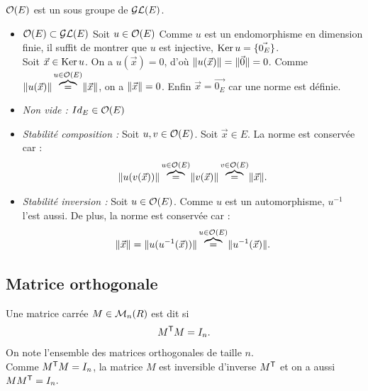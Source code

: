 \documentclass{book}
\begin{document}
\begin{Demonstration}
$\mathcal{O}(E)$ est un sous groupe de $\mathcal{GL}(E)$.
\begin{itemize}
\item \textit{$\mathcal{O}(E)\subset \mathcal{GL}(E)$} Soit $u\in \mathcal{O}(E)$ Comme $u$ est un endomorphisme en dimension finie, il suffit de montrer que $u$ est injective, $\operatorname{Ker} u=\{\vec{0_E}\}$.\\
Soit $\vec{x}\in  \operatorname{Ker} u$. On a $u( \vec{x})=0$, d'où $\mathopen\lVert u(\vec{x}) \mathclose\rVert=\mathopen\lVert \vec{0} \mathclose\rVert=0$.   Comme $\mathopen\lVert u( \vec{x}) \mathclose\rVert\overbrace{=}^{u\in\mathcal{O}(E) }\mathopen\lVert \vec{x} \mathclose\rVert$, on a $\mathopen\lVert \vec{x} \mathclose\rVert=0$. Enfin $\vec{x}=\vec{0_E}$ car une norme est définie.
\item \textit{Non vide :} $Id_E\in \mathcal{O}(E)$
\item \textit{Stabilité composition :} Soit $u,v \in \mathcal{O}(E)$. Soit $\vec{x}\in  E$. La norme est conservée car :
$$ \mathopen\lVert u(v(\vec{x})) \mathclose\rVert\overbrace{=}^{u\in \mathcal{O}(E)}\mathopen\lVert v(\vec{x}) \mathclose\rVert\overbrace{=}^{v\in \mathcal{O}(E)}\mathopen\lVert \vec{x} \mathclose\rVert.$$
\item \textit{Stabilité inversion :} Soit $u \in \mathcal{O}(E)$. Comme $u$ est un automorphisme, $u^{-1}$ l'est aussi. De plus, la norme est conservée car : 
$$ \mathopen\lVert \vec{x} \mathclose\rVert = \mathopen\lVert u( u^{-1}(\vec{x})) \mathclose\rVert\overbrace{=}^{u\in\mathcal{O}(E) }\mathopen\lVert u^{-1}(\vec{x}) \mathclose\rVert.$$
\end{itemize}
\end{Demonstration}
\subsection{Matrice orthogonale}
\begin{Definition}
Une matrice carrée $M \in \mathcal{M}_{n}(R)$ est dit  si $$M^{\mathsf {T}} M = I_n.$$
On note  l'ensemble des matrices orthogonales de taille $n$.\\
Comme $M^{\mathsf {T}} M = I_n$, la matrice $M$ est inversible d'inverse $M^{\mathsf {T}}$ et on a aussi $ M M^{\mathsf {T}}= I_n.$
\end{Definition}
\end{document}
